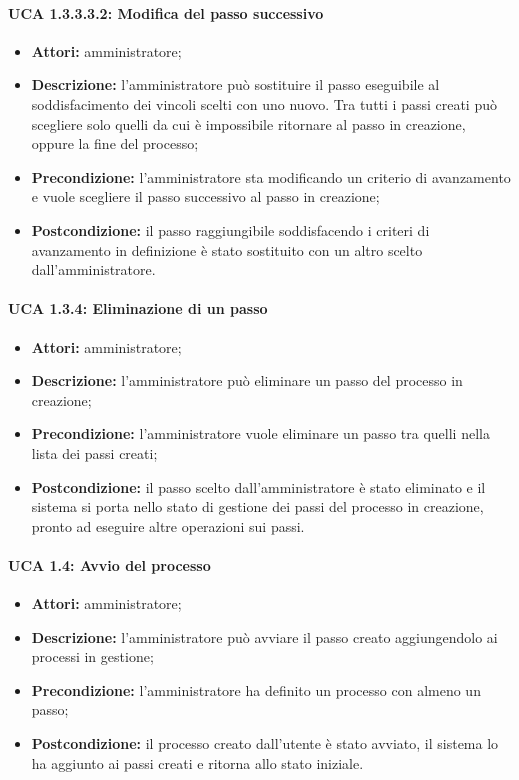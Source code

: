 \paragraph{UCA 1.3.3.3.2: Modifica del passo successivo}
\begin{itemize}
\item \textbf{Attori:} 
amministratore;
\item \textbf{Descrizione:}
l'amministratore può sostituire il passo eseguibile al soddisfacimento dei vincoli scelti con uno nuovo. Tra tutti i passi creati può scegliere solo quelli da cui è impossibile ritornare al passo in creazione, oppure la fine del processo;
\item \textbf{Precondizione:} 
l'amministratore sta modificando un criterio di avanzamento e vuole scegliere il passo successivo al passo in creazione;
\item \textbf{Postcondizione:}
il passo raggiungibile soddisfacendo i criteri di avanzamento in definizione è stato sostituito con un altro scelto dall'amministratore.
\end{itemize}

\paragraph{UCA 1.3.4: Eliminazione di un passo}
\begin{itemize}
\item \textbf{Attori:} 
amministratore;
\item \textbf{Descrizione:} 
l'amministratore può eliminare un passo del processo in creazione; 
\item \textbf{Precondizione:}
l'amministratore vuole eliminare un passo tra quelli nella lista dei passi creati;
\item \textbf{Postcondizione:}
il passo scelto dall'amministratore è stato eliminato e il sistema si porta nello stato di gestione dei passi del processo in creazione, pronto ad eseguire altre operazioni sui passi. 
\end{itemize}

\paragraph{UCA 1.4: Avvio del processo}
\begin{itemize}
\item \textbf{Attori:} 
amministratore;
\item \textbf{Descrizione:} 
l'amministratore può avviare il passo creato aggiungendolo ai processi in gestione; 
\item \textbf{Precondizione:} 
l'amministratore ha definito un processo con almeno un passo;
\item \textbf{Postcondizione:} 
il processo creato dall'utente è stato avviato, il sistema lo ha aggiunto ai passi creati e ritorna allo stato iniziale.
\end{itemize}

